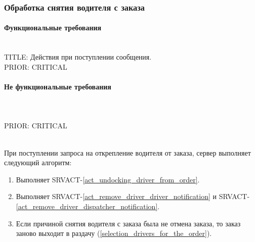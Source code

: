 \subsubsection{Обработка снятия водителя с заказа} \label{remove_driver_from_order}

    \paragraph{Функциональные требования} \mbox{}\\

      TITLE: Действия при поступлении сообщения.
     	\\
      PRIOR: CRITICAL\\

    \paragraph{Не функциональные требования} \mbox{}\\

      \\
      PRIOR: CRITICAL\\


    	\begin{alg}  \label{remove_driver_from_order_alg} \mbox{}\\

        При поступлении запроса на открепление водителя от заказа, сервер выполняет следующий алгоритм:

        \begin{enumerate}
          \item Выполняет SRVACT-\ref{act_undocking_driver_from_order}.
          \item Выполняет SRVACT-\ref{act_remove_driver_driver_notification} и SRVACT-\ref{act_remove_driver_dispatcher_notification}.
          \item Если причиной снятия водителя с заказа была не отмена заказа, то заказ заново выходит в раздачу (\ref{selection_drivers_for_the_order}).
        \end{enumerate}
      \end{alg}

